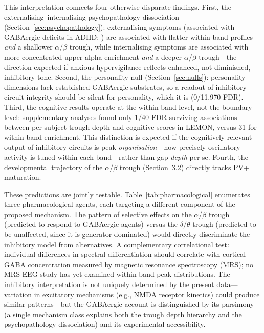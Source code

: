 This interpretation connects four otherwise disparate findings. First, the externalising--internalising psychopathology dissociation (Section~\ref{sec:psychopathology}): externalising symptoms (associated with GABAergic deficits in ADHD; \textcite{edden2012gaba}) are associated with flatter within-band profiles \emph{and} a shallower $\alpha$/$\beta$ trough, while internalising symptoms are associated with more concentrated upper-alpha enrichment \emph{and} a deeper $\alpha$/$\beta$ trough---the direction expected if anxious hypervigilance reflects enhanced, not diminished, inhibitory tone. Second, the personality null (Section~\ref{sec:nulls}): personality dimensions lack established GABAergic substrates, so a readout of inhibitory circuit integrity should be silent for personality, which it is (0/11,970 FDR). Third, the cognitive results operate at the within-band level, not the boundary level: supplementary analyses found only 1/40 FDR-surviving associations between per-subject trough depth and cognitive scores in LEMON, versus 31 for within-band enrichment. This distinction is expected if the cognitively relevant output of inhibitory circuits is peak \emph{organisation}---how precisely oscillatory activity is tuned within each band---rather than gap \emph{depth} per se. Fourth, the developmental trajectory of the $\alpha$/$\beta$ trough (Section~3.2) directly tracks PV+ maturation.

These predictions are jointly testable. Table~\ref{tab:pharmacological} enumerates three pharmacological agents, each targeting a different component of the proposed mechanism. The pattern of selective effects on the $\alpha$/$\beta$ trough (predicted to respond to GABAergic agents) versus the $\delta$/$\theta$ trough (predicted to be unaffected, since it is generator-dominated) would directly discriminate the inhibitory model from alternatives. A complementary correlational test: individual differences in spectral differentiation should correlate with cortical GABA concentration measured by magnetic resonance spectroscopy (MRS); no MRS-EEG study has yet examined within-band peak distributions. The inhibitory interpretation is not uniquely determined by the present data---variation in excitatory mechanisms (e.g., NMDA receptor kinetics) could produce similar patterns---but the GABAergic account is distinguished by its parsimony (a single mechanism class explains both the trough depth hierarchy and the psychopathology dissociation) and its experimental accessibility.

